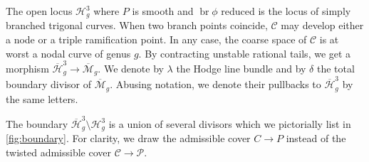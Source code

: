 \documentclass{amsart}
\newcommand{\orb}[1]{{\mathcal #1}}     %
\renewcommand {\o}[1]{\overline{#1}}
\DeclareMathOperator{\br}{br}
\renewcommand{\o}{\overline}
\begin{document}
The open locus $\orb H^3_g$ where $P$ is smooth and $\br\phi$ reduced is the locus of simply branched trigonal curves. When two branch points coincide, $\orb C$ may develop either a node or a triple ramification point. In any case, the coarse space of $\orb C$ is at worst a nodal curve of genus $g$. By contracting unstable rational tails, we get a morphism $\o{\orb H}^3_g \to \o{\orb M}_g$. We denote by $\lambda$ the Hodge line bundle and by $\delta$ the total boundary divisor of $\o {\orb M}_g$. Abusing notation, we denote their pullbacks to $\o {\orb H}^3_g$ by the same letters.

The boundary $\o {\orb H}^3_g \setminus \orb H^3_g$ is a union of several divisors which we pictorially list in \autoref{fig:boundary}. For clarity, we draw the admissible cover $C \to P$ instead of the twisted admissible cover $\orb C \to \orb P$.
\end{document}
